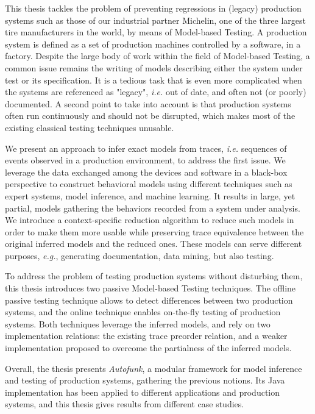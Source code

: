 This thesis tackles the problem of preventing
regressions in (legacy) production systems such as those of our
industrial partner Michelin, one of the three largest tire
manufacturers in the world, by means of Model-based Testing. A
production system is defined as a set of production machines
controlled by a software, in a factory.  Despite the large body
of work within the field of Model-based Testing, a common issue
remains the writing of models describing either the system under
test or its specification. It is a tedious task that is even more
complicated when the systems are referenced as "legacy",
\emph{i.e.} out of date, and often not (or poorly) documented. A
second point to take into account is that production systems
often run continuously and should not be disrupted, which makes
most of the existing classical testing techniques unusable.

We present an approach to infer exact models from traces,
\emph{i.e.} sequences of events observed in a production
environment, to address the first issue. We leverage the data
exchanged among the devices and software in a black-box
perspective to construct behavioral models using different
techniques such as expert systems, model inference, and machine
learning. It results in large, yet partial, models gathering the
behaviors recorded from a system under analysis. We introduce a
context-specific reduction algorithm to reduce such models in
order to make them more usable while preserving trace equivalence
between the original inferred models and the reduced ones. These
models can serve different purposes, \emph{e.g.}, generating
documentation, data mining, but also testing.

To address the problem of testing production systems without
disturbing them, this thesis introduces two passive Model-based
Testing techniques. The offline passive testing technique allows
to detect differences between two production systems, and the
online technique enables on-the-fly testing of production
systems. Both techniques leverage the inferred models, and rely
on two implementation relations: the existing trace preorder
relation, and a weaker implementation proposed to overcome the
partialness of the inferred models.

Overall, the thesis presents \emph{Autofunk}, a modular framework
for model inference and testing of production systems, gathering
the previous notions. Its Java implementation has been applied to
different applications and production systems, and this thesis
gives results from different case studies.
